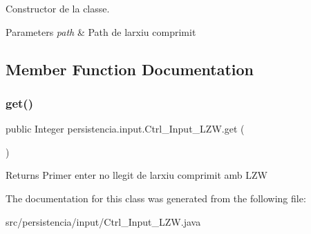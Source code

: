Constructor de la classe. 


\begin{DoxyParams}{Parameters}
{\em path} & Path de l\textquotesingle{}arxiu comprimit \\
\hline
\end{DoxyParams}


\subsection{Member Function Documentation}
\mbox{\label{classpersistencia_1_1input_1_1Ctrl__Input__LZW_a821592197863ec1b1f052a794753ea40}} 
\subsubsection{\texorpdfstring{get()}{get()}}
{\footnotesize\ttfamily public Integer persistencia.\+input.\+Ctrl\+\_\+\+Input\+\_\+\+L\+Z\+W.\+get (\begin{DoxyParamCaption}{ }\end{DoxyParamCaption})\hspace{0.3cm}{\ttfamily [inline]}}

\begin{DoxyReturn}{Returns}
Primer enter no llegit de l\textquotesingle{}arxiu comprimit amb L\+ZW 
\end{DoxyReturn}


The documentation for this class was generated from the following file\+:\begin{DoxyCompactItemize}
\item 
src/persistencia/input/Ctrl\+\_\+\+Input\+\_\+\+L\+Z\+W.\+java\end{DoxyCompactItemize}
